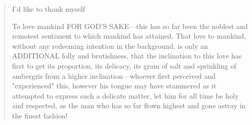 \newpage
\newenvironment{remerciment}
     {\vspace{6ex}\begin{quotation}\begin{center}\begin{em}}
     {\par\end{em}\end{center}\end{quotation}}

     \begin{remerciment}
\par I'd like to thank myself \\
\par To love mankind FOR GOD'S SAKE—this has so far been the noblest and remotest sentiment to which mankind has attained. That love to mankind, without any redeeming intention in the background, is only an ADDITIONAL folly and brutishness, that the inclination to this love has first to get its proportion, its delicacy, its gram of salt and sprinkling of ambergris from a higher inclination—whoever first perceived and "experienced" this, however his tongue may have stammered as it attempted to express such a delicate matter, let him for all time be holy and respected, as the man who has so far flown highest and gone astray in the finest fashion!   
     \end{remerciment}